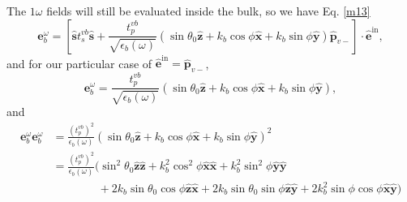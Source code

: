 The $1\omega$ fields will still be evaluated inside the bulk, so we have Eq.
\eqref{m13}
\begin{equation*}
\mathbf{e}^{\omega}_{b}
= \left[
\hat{\mathbf{s}}t_{s}^{vb}\hat{\mathbf{s}}
+ \frac{t^{vb}_{p}}{\sqrt{\epsilon_{b}(\omega)}}
\left(
  \sin\theta_{0}\hat{\mathbf{z}}
+ k_{b}\cos\phi\hat{\mathbf{x}}
+ k_{b}\sin\phi\hat{\mathbf{y}}
\right) 
\hat{\mathbf{p}}_{v-}
\right]
\cdot\hat{\mathbf{e}}^{\mathrm{in}},  
\end{equation*}
and for our particular case of
$\hat{\mathbf{e}}^{\mathrm{in}}=\hat{\mathbf{p}}_{v-}$,
\begin{equation*}
\mathbf{e}^{\omega}_{b}
= \frac{t^{vb}_{p}}{\sqrt{\epsilon_{b}(\omega)}}
\left(
  \sin\theta_{0}\hat{\mathbf{z}}
+ k_{b}\cos\phi\hat{\mathbf{x}}
+ k_{b}\sin\phi\hat{\mathbf{y}}
\right),
\end{equation*}
and
\begin{equation*}
\begin{split}
\mathbf{e}^{\omega}_{b}\mathbf{e}^{\omega}_{b}
&= \frac{\left(t^{vb}_{p}\right)^{2}}{\epsilon_{b}(\omega)}
\left(
  \sin\theta_{0}\hat{\mathbf{z}}
+ k_{b}\cos\phi\hat{\mathbf{x}}
+ k_{b}\sin\phi\hat{\mathbf{y}}
\right)^{2}\\
&= \frac{\left(t^{vb}_{p}\right)^{2}}{\epsilon_{b}(\omega)}
\big(
  \sin^{2}\theta_{0}\hat{\mathbf{z}}\hat{\mathbf{z}}
+ k^{2}_{b}\cos^{2}\phi\hat{\mathbf{x}}\hat{\mathbf{x}}
+ k^{2}_{b}\sin^{2}\phi\hat{\mathbf{y}}\hat{\mathbf{y}}\\
&\qquad\qquad
+ 2k_{b}\sin\theta_{0}\cos\phi\hat{\mathbf{z}}\hat{\mathbf{x}}
+ 2k_{b}\sin\theta_{0}\sin\phi\hat{\mathbf{z}}\hat{\mathbf{y}}
+ 2k^{2}_{b}\sin\phi\cos\phi\hat{\mathbf{x}}\hat{\mathbf{y}}
\big)
\end{split}
\end{equation*}

